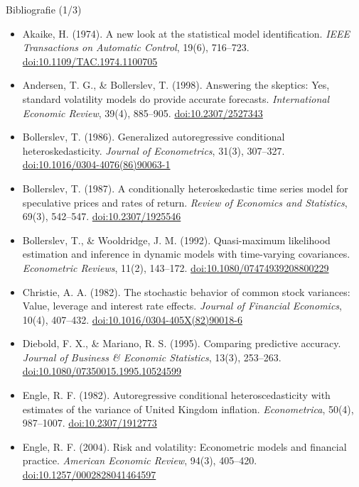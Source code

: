 \begin{frame}{Bibliografie (1/3)}
\itemsize{\scriptsize}
\begin{itemize}
    \item Akaike, H. (1974). A new look at the statistical model identification. \textit{IEEE Transactions on Automatic Control}, 19(6), 716--723. \href{https://doi.org/10.1109/TAC.1974.1100705}{doi:10.1109/TAC.1974.1100705}
    \item Andersen, T. G., \& Bollerslev, T. (1998). Answering the skeptics: Yes, standard volatility models do provide accurate forecasts. \textit{International Economic Review}, 39(4), 885--905. \href{https://doi.org/10.2307/2527343}{doi:10.2307/2527343}
    \item Bollerslev, T. (1986). Generalized autoregressive conditional heteroskedasticity. \textit{Journal of Econometrics}, 31(3), 307--327. \href{https://doi.org/10.1016/0304-4076(86)90063-1}{doi:10.1016/0304-4076(86)90063-1}
    \item Bollerslev, T. (1987). A conditionally heteroskedastic time series model for speculative prices and rates of return. \textit{Review of Economics and Statistics}, 69(3), 542--547. \href{https://doi.org/10.2307/1925546}{doi:10.2307/1925546}
    \item Bollerslev, T., \& Wooldridge, J. M. (1992). Quasi-maximum likelihood estimation and inference in dynamic models with time-varying covariances. \textit{Econometric Reviews}, 11(2), 143--172. \href{https://doi.org/10.1080/07474939208800229}{doi:10.1080/07474939208800229}
    \item Christie, A. A. (1982). The stochastic behavior of common stock variances: Value, leverage and interest rate effects. \textit{Journal of Financial Economics}, 10(4), 407--432. \href{https://doi.org/10.1016/0304-405X(82)90018-6}{doi:10.1016/0304-405X(82)90018-6}
    \item Diebold, F. X., \& Mariano, R. S. (1995). Comparing predictive accuracy. \textit{Journal of Business \& Economic Statistics}, 13(3), 253--263. \href{https://doi.org/10.1080/07350015.1995.10524599}{doi:10.1080/07350015.1995.10524599}
    \item Engle, R. F. (1982). Autoregressive conditional heteroscedasticity with estimates of the variance of United Kingdom inflation. \textit{Econometrica}, 50(4), 987--1007. \href{https://doi.org/10.2307/1912773}{doi:10.2307/1912773}
    \item Engle, R. F. (2004). Risk and volatility: Econometric models and financial practice. \textit{American Economic Review}, 94(3), 405--420. \href{https://doi.org/10.1257/0002828041464597}{doi:10.1257/0002828041464597}
\end{itemize}
\end{frame}

